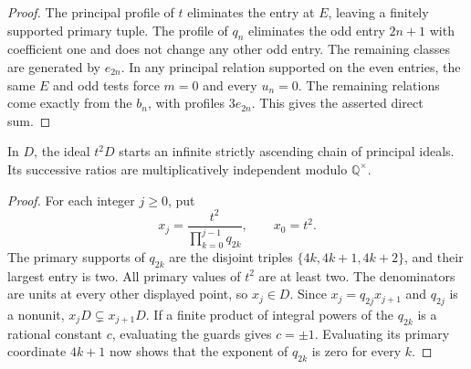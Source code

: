 \begin{proof}
    The principal profile of $t$ eliminates the entry at $E$, leaving a finitely supported primary tuple.
    The profile of $q_n$ eliminates the odd entry $2n + 1$ with coefficient one and does not change any other odd entry.
    The remaining classes are generated by $e_{2n}$.
    In any principal relation supported on the even entries, the same $E$ and odd tests force $m = 0$ and every $u_n = 0$.
    The remaining relations come exactly from the $b_n$, with profiles $3e_{2n}$.
    This gives the asserted direct sum.
\end{proof}

\begin{corollary}
    \label{cor:chain}
    In $D$, the ideal $t^2 D$ starts an infinite strictly ascending chain of principal ideals.
    Its successive ratios are multiplicatively independent modulo $\mathbb{Q}^\times$.
\end{corollary}

\begin{proof}
    For each integer $j \ge 0$, put
    \[
        x_j = \frac{t^2}{\prod_{k = 0}^{j - 1} q_{2k}},
        \qquad x_0 = t^2.
    \]
    The primary supports of $q_{2k}$ are the disjoint triples $\{4k, 4k + 1, 4k + 2\}$, and their largest entry is two.
    All primary values of $t^2$ are at least two.
    The denominators are units at every other displayed point, so $x_j \in D$.
    Since $x_j = q_{2j} x_{j + 1}$ and $q_{2j}$ is a nonunit, $x_jD \subsetneq x_{j + 1}D$.
    If a finite product of integral powers of the $q_{2k}$ is a rational constant $c$, evaluating the guards gives $c = \pm 1$.
    Evaluating its primary coordinate $4k + 1$ now shows that the exponent of $q_{2k}$ is zero for every $k$.
\end{proof}
